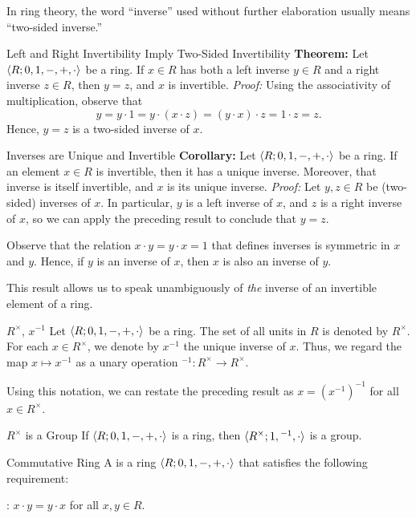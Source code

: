 \documentclass[12pt]{report}
\begin{document}
In ring theory, the word ``inverse'' used without further elaboration usually means ``two-sided inverse.''

\begin{thmbox}{Left and Right Invertibility Imply Two-Sided Invertibility}
	\textbf{Theorem:} Let ${\langle {R; 0, 1, -, +, \cdot} \rangle}$ be a ring. If $x \in R$ has both a left inverse $y \in R$ and a right inverse $z \in R$, then $y = z$, and $x$ is invertible.
\tcblower
	\textit{Proof:} Using the associativity of multiplication, observe that
	\[ y = y \cdot 1 = y \cdot (x \cdot z) = (y \cdot x) \cdot z = 1 \cdot z = z. \]
	Hence, $y = z$ is a two-sided inverse of $x$.
\end{thmbox}

\begin{thmbox}{Inverses are Unique and Invertible}
	\textbf{Corollary:} Let ${\langle {R; 0, 1, -, +, \cdot} \rangle}$ be a ring. If an element $x \in R$ is invertible, then it has a unique inverse. Moreover, that inverse is itself invertible, and $x$ is its unique inverse.
\tcblower
	\textit{Proof:} Let $y,z \in R$ be (two-sided) inverses of $x$. In particular, $y$ is a left inverse of $x$, and $z$ is a right inverse of $x$, so we can apply the preceding result to conclude that $y = z$.

	Observe that the relation $x \cdot y = y \cdot x = 1$ that defines inverses is symmetric in $x$ and $y$. Hence, if $y$ is an inverse of $x$, then $x$ is also an inverse of $y$.
\end{thmbox}

This result allows us to speak unambiguously of \textit{the} inverse of an invertible element of a ring.

\begin{dfnbox}{$R^\times$, $x^{-1}$}
	Let ${\langle {R; 0, 1, -, +, \cdot} \rangle}$ be a ring. The set of all units in $R$ is denoted by $R^\times$. For each $x \in R^\times$, we denote by $x^{-1}$ the unique inverse of $x$. Thus, we regard the map $x \mapsto x^{-1}$ as a unary operation ${}^{-1}: R^\times \to R^\times$.
\end{dfnbox}

Using this notation, we can restate the preceding result as $x = (x^{-1})^{-1}$ for all $x \in R^\times$.

\begin{thmbox}{$R^\times$ is a Group}
	If ${\langle {R; 0, 1, -, +, \cdot} \rangle}$ is a ring, then ${\langle {R^\times; 1, {}^{-1}, \cdot} \rangle}$ is a group.
\end{thmbox}

\begin{dfnbox}{Commutative Ring}
	A  is a ring ${\langle {R; 0, 1, -, +, \cdot} \rangle}$ that satisfies the following requirement:
	\begin{dfnitems}
		\item {}: $x \cdot y = y \cdot x$ for all $x, y \in R$.
	\end{dfnitems}
\end{dfnbox}
\end{document}

